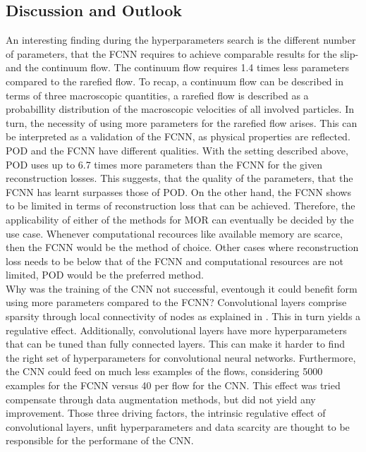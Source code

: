 \subsection{Discussion and Outlook}
An interesting finding during the hyperparameters search is the different number of parameters, that the FCNN requires to achieve comparable results for the slip- and the continuum flow. The continuum flow requires 1.4 times less parameters compared to the rarefied flow. To recap, a continuum flow can be described in terms of three macroscopic quantities, a rarefied flow is described as a probabillity distribution of the macroscopic velocities of all involved particles. In turn, the necessity of using more parameters for the rarefied flow arises. This can be interpreted as a validation of the FCNN, as physical properties are reflected.\\
POD and the FCNN have different qualities. With the setting described above, POD uses up to 6.7 times more parameters than the FCNN for the given reconstruction losses. This suggests, that the quality of the parameters, that the FCNN has learnt surpasses those of POD. On the other hand, the FCNN shows to be limited in terms of reconstruction loss that can be achieved. Therefore, the applicability of either of the methods for MOR can eventually be decided by the use case. Whenever computational recources like available memory are scarce, then the FCNN would be the method of choice. Other cases where reconstruction loss needs to be below that of the FCNN and computational resources are not limited, POD would be the preferred method.\\
Why was the training of the CNN not successful, eventough it could benefit form using more parameters compared to the FCNN? Convolutional layers comprise sparsity through local connectivity of nodes as explained in \cite{Goodfellow}. This in turn yields a regulative effect. Additionally, convolutional layers have more hyperparameters that can be tuned than fully connected layers. This can make it harder to find the right set of hyperparameters for convolutional neural networks. Furthermore, the CNN could feed on much less examples of the flows, considering 5000 examples for the FCNN versus 40 per flow for the CNN. This effect was tried compensate through data augmentation methods, but did not yield any improvement. Those three driving factors, the intrinsic regulative effect of convolutional layers, unfit hyperparameters and data scarcity are thought to be responsible for the performane of the CNN.\\
